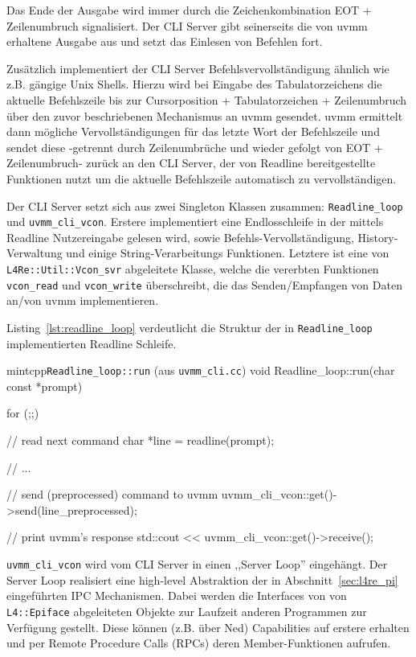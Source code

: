 Das Ende der Ausgabe wird immer durch die Zeichenkombination EOT +
Zeilenumbruch signalisiert. Der CLI Server gibt seinerseits die von uvmm
erhaltene Ausgabe aus und setzt das Einlesen von Befehlen fort.

Zusätzlich implementiert der CLI Server Befehlsvervollständigung ähnlich wie
z.B. gängige Unix Shells. Hierzu wird bei Eingabe des Tabulatorzeichens die
aktuelle Befehlszeile bis zur Cursorposition + Tabulatorzeichen + Zeilenumbruch
über den zuvor beschriebenen Mechanismus an uvmm gesendet. uvmm ermittelt dann
mögliche Vervollständigungen für das letzte Wort der Befehlszeile und sendet
diese -getrennt durch Zeilenumbrüche und wieder gefolgt von EOT + Zeilenumbruch-
zurück an den CLI Server, der von Readline bereitgestellte Funktionen nutzt um
die aktuelle Befehlszeile automatisch zu vervollständigen.

Der CLI Server setzt sich aus zwei Singleton Klassen zusammen:
\texttt{Readline\_loop} und \texttt{uvmm\_cli\_vcon}. Erstere implementiert
eine Endlosschleife in der mittels Readline Nutzereingabe gelesen wird, sowie
Befehls-Vervollständigung, History-Verwaltung und einige String-Verarbeitungs
Funktionen.  Letztere ist eine von \texttt{L4Re::Util::Vcon\_svr} abgeleitete
Klasse, welche die vererbten Funktionen \texttt{vcon\_read} und
\texttt{vcon\_write} überschreibt, die das Senden/Empfangen von Daten
an/von uvmm implementieren.

Listing~\ref{lst:readline_loop} verdeutlicht die Struktur der in
\texttt{Readline\_loop} implementierten Readline Schleife.

\begin{mintlisting}[label=lst:readline_loop]{mintcpp}{\texttt{Readline\_loop::run} (aus \texttt{uvmm\_cli.cc})}
void Readline_loop::run(char const *prompt)
{
  for (;;)
    {
      // read next command
      char *line = readline(prompt);

      // ...

      // send (preprocessed) command to uvmm
      uvmm_cli_vcon::get()->send(line_preprocessed);

      // print uvmm's response
      std::cout << uvmm_cli_vcon::get()->receive();
    }
}
\end{mintlisting}

\texttt{uvmm\_cli\_vcon} wird vom CLI Server in einen ,,Server Loop''
eingehängt. Der Server Loop realisiert eine high-level Abstraktion der in
Abschnitt~\ref{sec:l4re_pi} eingeführten IPC Mechanismen. Dabei werden die
Interfaces von von \texttt{L4::Epiface} abgeleiteten Objekte zur Laufzeit
anderen Programmen zur Verfügung gestellt. Diese können (z.B. über Ned)
Capabilities auf erstere erhalten und per Remote Procedure Calls (RPCs) deren
Member-Funktionen aufrufen.

